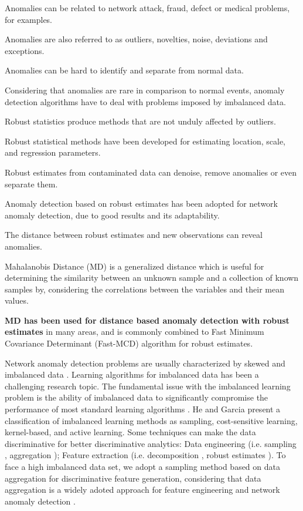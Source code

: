 \documentclass[review]{elsarticle}
\begin{document}
Anomalies can be related to network attack, fraud, defect or medical problems, for examples.

Anomalies are also referred to as outliers, novelties, noise, deviations and exceptions.

Anomalies can be hard to identify and separate from normal data.

Considering that anomalies are rare in comparison to normal events, anomaly detection algorithms have to deal with problems imposed by imbalanced data.



Robust statistics produce methods that are not unduly affected by outliers.

Robust statistical methods have been developed for estimating location, scale, and regression parameters.

Robust estimates from contaminated data can denoise, remove anomalies or even separate them.

Anomaly detection based on robust estimates has been adopted for network anomaly detection, due to good results and its adaptability.

The distance between robust estimates and new observations can reveal anomalies.

Mahalanobis Distance (MD) is a generalized distance which is useful for determining the similarity between an unknown sample and a collection of known samples by, considering the correlations between the variables and their mean values.

\textbf{MD has been used for distance based anomaly detection with robust estimates} in many areas, and is commonly combined to Fast Minimum Covariance Determinant (Fast-MCD) algorithm \cite{rousseeuw1999fastmcd} for robust estimates.

Network anomaly detection problems are usually characterized by skewed and imbalanced data \cite{Phua2004minority,he2008learning}. Learning algorithms for imbalanced data has been a challenging research topic. The fundamental issue with the imbalanced learning problem is the ability of imbalanced data to significantly compromise the performance of most standard learning algorithms \cite{he2008learning}. He and Garcia \cite{he2008learning} present a classification of imbalanced learning methods as sampling, cost-sensitive learning, kernel-based, and active learning. Some techniques can make the data discriminative for better discriminative analytics: Data engineering (i.e. sampling \cite{he2008learning}, aggregation \cite{callegari2011novel, acarali2016survey}); Feature extraction (i.e. decomposition \cite{vaswani2018robust}, robust estimates \cite{zhou2017anomaly}). To face a high imbalanced data set, we adopt a sampling method based on data aggregation for discriminative feature generation, considering that data aggregation is a widely adoted approach for feature engineering \cite{chandrashekar2014survey,acarali2016survey} and network anomaly detection \cite{lakhina2005mining, callegari2011novel, vieira2017model}.
\end{document}
